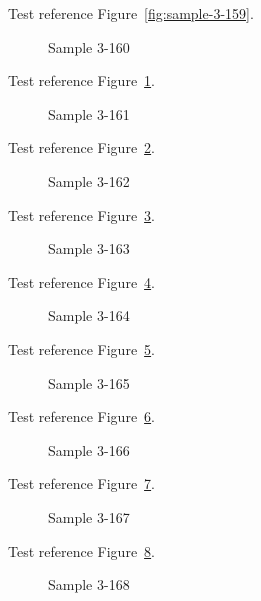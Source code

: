 Test reference Figure~\ref{fig:sample-3-159}.

\begin{figure}[tbhp]
\caption{Sample 3-160}
\label{fig:sample-3-160}
\end{figure}

Test reference Figure~\ref{fig:sample-3-160}.

\begin{figure}[tbhp]
\caption{Sample 3-161}
\label{fig:sample-3-161}
\end{figure}

Test reference Figure~\ref{fig:sample-3-161}.

\begin{figure}[tbhp]
\caption{Sample 3-162}
\label{fig:sample-3-162}
\end{figure}

Test reference Figure~\ref{fig:sample-3-162}.

\begin{figure}[tbhp]
\caption{Sample 3-163}
\label{fig:sample-3-163}
\end{figure}

Test reference Figure~\ref{fig:sample-3-163}.

\begin{figure}[tbhp]
\caption{Sample 3-164}
\label{fig:sample-3-164}
\end{figure}

Test reference Figure~\ref{fig:sample-3-164}.

\begin{figure}[tbhp]
\caption{Sample 3-165}
\label{fig:sample-3-165}
\end{figure}

Test reference Figure~\ref{fig:sample-3-165}.

\begin{figure}[tbhp]
\caption{Sample 3-166}
\label{fig:sample-3-166}
\end{figure}

Test reference Figure~\ref{fig:sample-3-166}.

\begin{figure}[tbhp]
\caption{Sample 3-167}
\label{fig:sample-3-167}
\end{figure}

Test reference Figure~\ref{fig:sample-3-167}.

\begin{figure}[tbhp]
\caption{Sample 3-168}
\label{fig:sample-3-168}
\end{figure}

